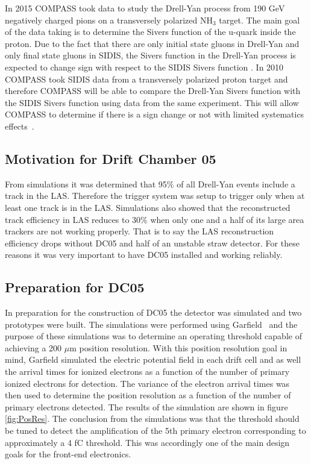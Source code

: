 \documentclass[aps,prl,twocolumn,groupedaddress]{revtex4-1}
\begin{document}
\par

In 2015 COMPASS took data to study the Drell-Yan process from 190 GeV negatively
charged pions on a transversely polarized NH$_3$ target.  The main goal of the
data taking is to determine the Sivers function of the u-quark inside the proton.
Due to the fact that there are only initial state gluons in Drell-Yan and only
final state gluons in SIDIS, the Sivers function in the Drell-Yan process is
expected to change sign with respect to the SIDIS Sivers function
\cite{collins_2002}.  In 2010 COMPASS took SIDIS data from a transversely
polarized proton target and therefore COMPASS will be able to compare the
Drell-Yan Sivers function with the SIDIS Sivers function using data from the
same experiment.  This will allow COMPASS to determine if there is a sign change
or not with limited systematics effects~\cite{proposal}.

\subsection{Motivation for Drift Chamber 05}
From simulations it was determined that 95\% of all Drell-Yan events include a
track in the LAS.  Therefore the trigger system was setup
to trigger only when at least one track is in the LAS.
Simulations also showed that the reconstructed track efficiency in LAS reduces
to 30\% when only one and a half of its large area trackers are not working
properly.  That is to say the LAS reconstruction efficiency drops without DC05
and half of an unstable straw detector.  For these reasons it was very important
to have DC05 installed and working reliably.

\subsection{Preparation for DC05}
In preparation for the construction of DC05 the detector was
simulated and two prototypes were built.  The simulations were performed using
Garfield~\cite{garfield} and the purpose of these simulations was to determine an operating
threshold capable of achieving a 200 $\mu$m position resolution.
With this position resolution goal in mind, Garfield simulated the electric
potential field in each drift cell and as well the arrival times for ionized electrons as a
function of the number of primary ionized electrons for detection.  The variance
of the electron arrival times was then used to determine the position resolution
as a function of the number of primary electrons detected.  The results of the
simulation are shown in figure \ref{fig:PosRes}.  The conclusion from the
simulations was that the threshold should be tuned to detect the amplification
of the 5th primary electron corresponding to approximately a 4 fC threshold.
This was accordingly one of the main design goals for the front-end electronics. \par
\end{document}

